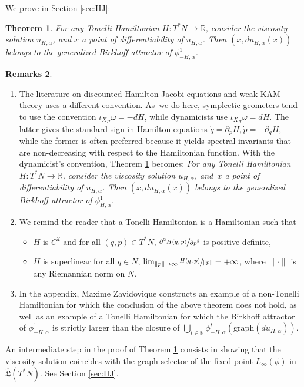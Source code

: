 \documentclass[10pt]{amsart}
\newtheorem{thm}{Theorem}[section]
\theoremstyle{definition}
\newtheorem{rems}[thm]{Remarks}
\newcommand{\R}{\mathbb{R}}
\newcommand{\fL}{\mathfrak {L}}
\newcommand{\hatL}{\widehat{\fL}}
\providecommand{\skpt}{\par\smallskip\noindent}
\begin{document}
We prove in Section \ref{sec:HJ}:


\begin{thm}\label{th:discounted}
For any Tonelli Hamiltonian $H:T^*N\to\R$, consider the viscosity solution $u_{H,\alpha}$, and $x$ a point of differentiability of $u_{H, \alpha}$. Then $(x,du_{H,\alpha}(x))$ belongs to the generalized Birkhoff attractor of $\phi_{-H,\alpha}^1$.
\end{thm}


\skpt
\begin{rems}
\begin{enumerate}
\item The literature on discounted Hamilton-Jacobi equations and weak KAM theory uses a different convention. As~we do here, symplectic geometers tend to use the convention $\iota_{X_H}\omega=-dH$, while dynamicists use $\iota_{X_H}\omega=dH$. The latter gives the standard sign in Hamilton equations $\dot q=\partial_pH, \dot p=-\partial_qH$, while the former is often preferred because it yields spectral invariants that are non-decreasing with respect to the Hamiltonian function.
With the dynamicist's convention, Theorem \ref{th:discounted} becomes: \emph{For any Tonelli Hamiltonian $H:T^*N\to\R$, consider the viscosity solution $u_{H,\alpha}$, and~$x$ a point of differentiability of $u_{H, \alpha}$. Then $(x,du_{H,\alpha}(x))$ belongs to the generalized Birkhoff attractor of $\phi_{H,\alpha}^1$.}
\item We remind the reader that a Tonelli Hamiltonian is a Hamiltonian such that
\begin{itemize}
\item $H$ is $C^2$ and for all $(q, p)\in T^*N$, $\sfrac{\partial^2 H(q,p)}{\partial p^2}$ is positive definite,
\item $H$ is superlinear \ie for all $q\in N$, $\lim_{\| p\|\to\infty} \sfrac{H(q, p)}{\| p\|}=+\infty$, where $\|\cdot\|$ is any Riemannian norm on $N$.
\end{itemize}
\item
In the appendix, Maxime Zavidovique constructs an example of a non-Tonelli Hamiltonian for which the conclusion of the above theorem does not hold, as well as an example of a Tonelli Hamiltonian for which the Birkhoff attractor of $\phi_{-H,\alpha}^1$ is strictly larger than the closure of $\bigcup_{t\in\R}\phi_{-H,\alpha}^t(\mathrm{graph}(du_{H, \alpha}))$.
\end{enumerate}
\end{rems}
An intermediate step in the proof of Theorem \ref{th:discounted} consists in showing that the viscosity solution coincides with the graph selector of the fixed point $L_\infty(\phi)$ in $\hatL(T^*N)$. See Section \ref{sec:HJ}.
\end{document}
